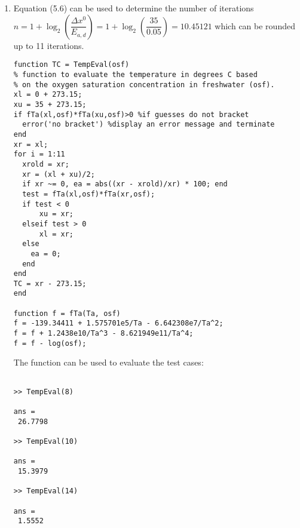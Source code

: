 \documentclass[../main.tex]{subfiles}
\begin{document}
\section{}
\begin{enumerate}[label=\bfseries(\alph*)]
\item Equation (5.6) can be used to determine the number of iterations
\bigbreak
$n=1+\log _{2}\left(\dfrac{\Delta x^{0}}{E_{a, d}}\right)=1+\log _{2}\left(\dfrac{35}{0.05}\right)=10.45121$
\bigbreak
which can be rounded up to 11 iterations.
\bigbreak

\begin{lstlisting}[numbers=none]
function TC = TempEval(osf)
% function to evaluate the temperature in degrees C based
% on the oxygen saturation concentration in freshwater (osf).
xl = 0 + 273.15;
xu = 35 + 273.15;
if fTa(xl,osf)*fTa(xu,osf)>0 %if guesses do not bracket
  error('no bracket') %display an error message and terminate
end
xr = xl;
for i = 1:11
  xrold = xr;
  xr = (xl + xu)/2;
  if xr ~= 0, ea = abs((xr - xrold)/xr) * 100; end
  test = fTa(xl,osf)*fTa(xr,osf);
  if test < 0
 	  xu = xr;
  elseif test > 0
 	  xl = xr;
  else
    ea = 0;
  end
end
TC = xr - 273.15;
end

function f = fTa(Ta, osf)
f = -139.34411 + 1.575701e5/Ta - 6.642308e7/Ta^2;
f = f + 1.2438e10/Ta^3 - 8.621949e11/Ta^4;
f = f - log(osf);
\end{lstlisting}
\bigbreak
The function can be used to evaluate the test cases:
\bigbreak
\begin{lstlisting}[numbers=none]

>> TempEval(8)

ans =
 26.7798
 
>> TempEval(10)

ans =
 15.3979
 
>> TempEval(14)

ans =
 1.5552

\end{lstlisting}
\end{enumerate}
\end{document}
